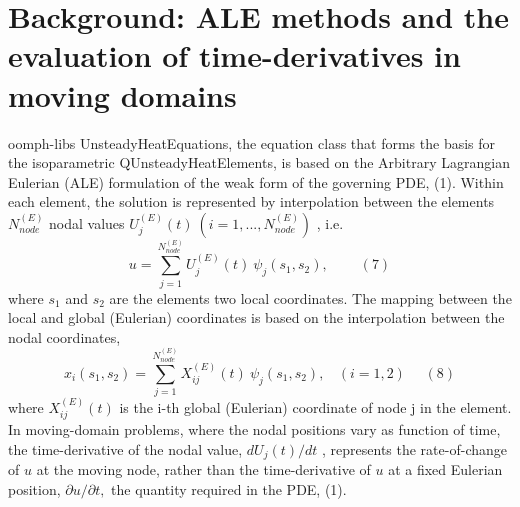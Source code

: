  

\hypertarget{index_ale}{}\section{Background\+: A\+L\+E methods and the evaluation of time-\/derivatives in moving domains}\label{index_ale}
{\ttfamily oomph-\/lib\textquotesingle{}s} {\ttfamily Unsteady\+Heat\+Equations}, the equation class that forms the basis for the isoparametric {\ttfamily Q\+Unsteady\+Heat\+Elements}, is based on the Arbitrary Lagrangian Eulerian (A\+LE) formulation of the weak form of the governing P\+DE, (1). Within each element, the solution is represented by interpolation between the element\textquotesingle{}s $ N_{node}^{(E)} $ nodal values $ U_j^{(E)}(t) \ (i=1,..., N_{node}^{(E)})$ , i.\+e. \[ u = \sum_{j=1}^{N_{node}^{(E)}} U_j^{(E)}(t) \ \psi_{j}(s_1,s_2), \ \ \ \ \ \ \ \ \ \ (7) \] where $ s_1 $ and $ s_2 $ are the element\textquotesingle{}s two local coordinates. The mapping between the local and global (Eulerian) coordinates is based on the interpolation between the nodal coordinates, \[ x_i(s_1,s_2) = \sum_{j=1}^{N_{node}^{(E)}} X_{ij}^{(E)}(t) \ \psi_{j}(s_1,s_2), \ \ \ \ (i=1,2) \ \ \ \ \ \ (8) \] where $ X_{ij}^{(E)}(t) $ is the i-\/th global (Eulerian) coordinate of node j in the element. In moving-\/domain problems, where the nodal positions vary as function of time, the time-\/derivative of the nodal value, $ dU_j(t)/dt $ , represents the rate-\/of-\/change of $ u $ at the moving node, rather than the time-\/derivative of $ u $ at a fixed Eulerian position, $ \partial u/\partial t, $ the quantity required in the P\+DE, (1).

